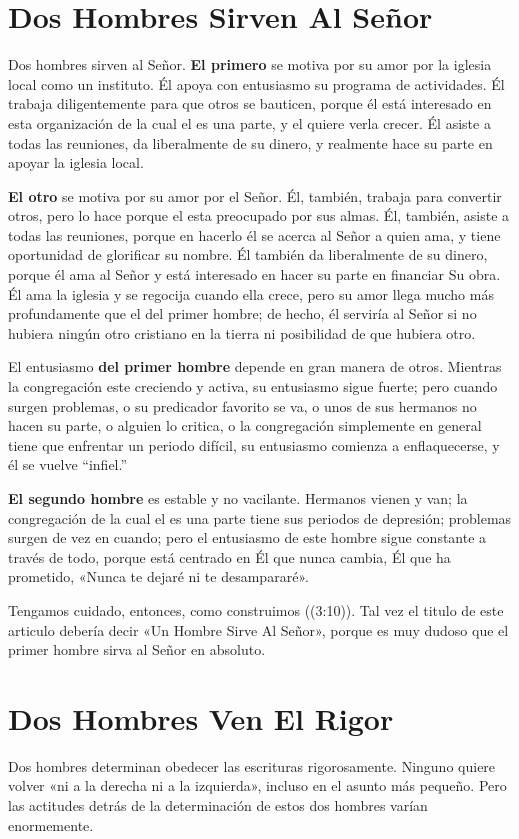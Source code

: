 \documentclass[12pt, twoside, openright]{book}
\begin{document}
\section{Dos Hombres Sirven Al Señor}
Dos hombres sirven al Señor. \textbf{El primero} se motiva por su amor por la iglesia local como un instituto. Él apoya con entusiasmo su programa de actividades. Él trabaja diligentemente para que otros se bauticen, porque él está interesado en esta organización de la cual el es una parte, y el quiere verla crecer. Él asiste a todas las reuniones, da liberalmente de su dinero, y realmente hace su parte en apoyar la iglesia local. 

\textbf{El otro} se motiva por su amor por el Señor. Él, también, trabaja para convertir otros, pero lo hace porque el esta preocupado por sus almas. Él, también, asiste a todas las reuniones, porque en hacerlo él se acerca al Señor a quien ama, y tiene oportunidad de glorificar su nombre. Él también da liberalmente de su dinero, porque él ama al Señor y está interesado en hacer su parte en financiar Su obra. Él ama la iglesia y se regocija cuando ella crece, pero su amor llega mucho más profundamente que el del primer hombre; de hecho, él serviría al Señor si no hubiera ningún otro cristiano en la tierra ni posibilidad de que hubiera otro. 

El entusiasmo \textbf{del primer hombre} depende en gran manera de otros. Mientras la congregación este creciendo y activa, su entusiasmo sigue fuerte; pero cuando surgen problemas, o su predicador favorito se va, o unos de sus hermanos no hacen su parte, o alguien lo critica, o la congregación simplemente en general tiene que enfrentar un periodo difícil, su entusiasmo comienza a enflaquecerse, y él se vuelve “infiel.” 

\textbf{El segundo hombre} es estable y no vacilante. Hermanos vienen y van; la congregación de la cual el es una parte tiene sus periodos de depresión; problemas surgen de vez en cuando; pero el entusiasmo de este hombre sigue constante a través de todo, porque está centrado en Él que nunca cambia, Él que ha prometido, «Nunca te dejaré ni te desampararé». 

Tengamos cuidado, entonces, como construimos ((3:10)). Tal vez el titulo de este articulo debería decir «Un Hombre Sirve Al Señor», porque es muy dudoso que el primer hombre sirva al Señor en absoluto. 

\section{Dos Hombres Ven El Rigor}
Dos hombres determinan obedecer las escrituras rigorosamente. Ninguno quiere volver «ni a la derecha ni a la izquierda», incluso en el asunto más pequeño. Pero las actitudes detrás de la determinación de estos dos hombres varían enormemente. 
\end{document}
